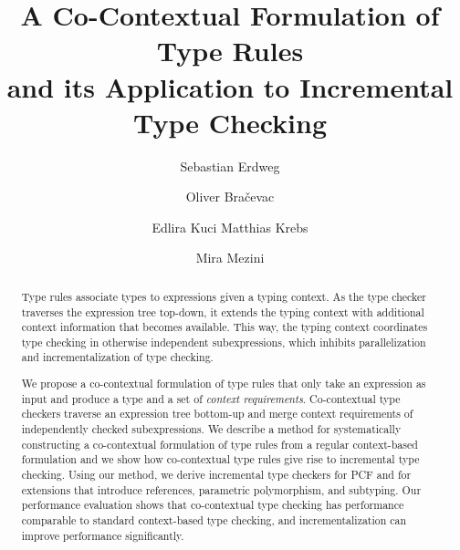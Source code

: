 \documentclass{llncs}
\begin{document}
\title{A Co-Contextual Formulation of Type Rules\\ and its Application to Incremental Type Checking}
%

\author{Sebastian Erdweg\and Oliver Bra\v{c}evac \and Edlira Kuci \newline Matthias
  Krebs \and Mira Mezini%
}

\maketitle

\begin{abstract}
  Type rules associate types to expressions given a typing context. As the type
  checker traverses the expression tree top-down, it extends the typing context
  with additional context information that becomes available. This way, the
  typing context coordinates type checking in otherwise independent
  subexpressions, which inhibits parallelization and incrementalization of type
  checking.

  We propose a co-contextual formulation of type rules that only take an
  expression as input and produce a type and a set of \emph{context
    requirements}. Co-contextual type checkers traverse an expression tree
  bottom-up and merge context requirements of independently checked
  subexpressions. We describe a method for systematically constructing a
  co-contextual formulation of type rules from a regular context-based
  formulation and we show how co-contextual type rules give rise to incremental
  type checking. Using our method, we derive incremental type checkers for PCF
  and for extensions that introduce references, parametric polymorphism, and
  subtyping. Our performance evaluation shows that co-contextual type checking
  has performance comparable to standard context-based type checking, and
  incrementalization can improve performance significantly.
\end{abstract}

\renewcommand{\paragraph}[1]{\vspace{1ex}\noindent\textbf{#1}}


\newcommand{\OR}{\ensuremath{\;|\;}}
\newcommand{\WHERE}{\OR}
\newcommand{\ctxcolor}{\textred}
\newcommand{\typecolor}{\textblue}
\newcommand{\conscolor}{\textblue}
\newcommand{\reqcolor}{\textred}
\newcommand{\typectxcolor}[1]{\textpurple{\ensuremath{#1}}}
\newcommand{\type}[1]{\ensuremath{\typecolor{#1}}}
\newcommand{\context}[1]{\ensuremath{\ctxcolor{#1}}}
\end{document}

